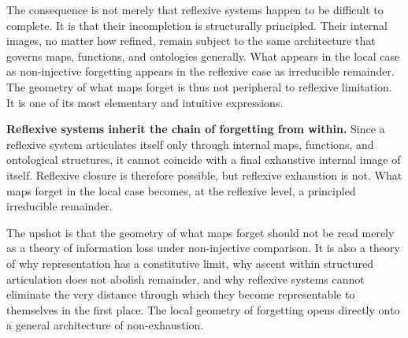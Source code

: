 \documentclass[11pt,a4paper]{article}
\newenvironment{keybox}[1]{%
  \Needspace*{8\baselineskip}%
  \begin{tcolorbox}[
    enhanced,
    breakable=false,
    colback=blue!5,
    colframe=blue!45!black,
    coltitle=black,
    colbacktitle=blue!14,
    boxrule=0.85pt,
    arc=2.5pt,
    left=9pt, right=9pt, top=6pt, bottom=6pt,
    titlerule=0.55pt,
    fonttitle=\bfseries,
    title={#1},
    before upper=\raggedright,
    before skip=0.9\baselineskip,
    after skip=0.9\baselineskip
  ]%
}{%
  \end{tcolorbox}%
}
\theoremstyle{plain}
\theoremstyle{definition}
\theoremstyle{remark}
\begin{document}
The consequence is not merely that reflexive systems happen to be difficult to complete. It is that their incompletion is structurally principled. Their internal images, no matter how refined, remain subject to the same architecture that governs maps, functions, and ontologies generally. What appears in the local case as non-injective forgetting appears in the reflexive case as irreducible remainder. The geometry of what maps forget is thus not peripheral to reflexive limitation. It is one of its most elementary and intuitive expressions.

\begin{keybox}{Reflexive systems inherit the chain}
\textbf{Reflexive systems inherit the chain of forgetting from within.} Since a reflexive system articulates itself only through internal maps, functions, and ontological structures, it cannot coincide with a final exhaustive internal image of itself. Reflexive closure is therefore possible, but reflexive exhaustion is not. What maps forget in the local case becomes, at the reflexive level, a principled irreducible remainder.
\end{keybox}

The upshot is that the geometry of what maps forget should not be read merely as a theory of information loss under non-injective comparison. It is also a theory of why representation has a constitutive limit, why ascent within structured articulation does not abolish remainder, and why reflexive systems cannot eliminate the very distance through which they become representable to themselves in the first place. The local geometry of forgetting opens directly onto a general architecture of non-exhaustion.
\end{document}
